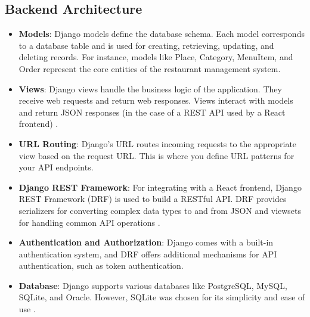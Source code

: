 \subsection{Backend Architecture}
\begin{itemize}
    \item \textbf{Models}: Django models define the database schema. Each model corresponds to a database table and is used for creating, retrieving, updating, and deleting records. For instance, models like Place, Category, MenuItem, and Order represent the core entities of the restaurant management system.
    \item \textbf{Views}: Django views handle the business logic of the application. They receive web requests and return web responses. Views interact with models and return JSON responses (in the case of a REST API used by a React frontend) \cite{18}.
    \item \textbf{URL Routing}: Django's URL routes incoming requests to the appropriate view based on the request URL. This is where you define URL patterns for your API endpoints.
    \item \textbf{Django REST Framework}: For integrating with a React frontend, Django REST Framework (DRF) is used to build a RESTful API. DRF provides serializers for converting complex data types to and from JSON and viewsets for handling common API operations \cite{20}.
    \item \textbf{Authentication and Authorization}: Django comes with a built-in authentication system, and DRF offers additional mechanisms for API authentication, such as token authentication.
    \item \textbf{Database}: Django supports various databases like PostgreSQL, MySQL, SQLite, and Oracle. However, SQLite was chosen for its simplicity and ease of use \cite{17}.
\end{itemize}

